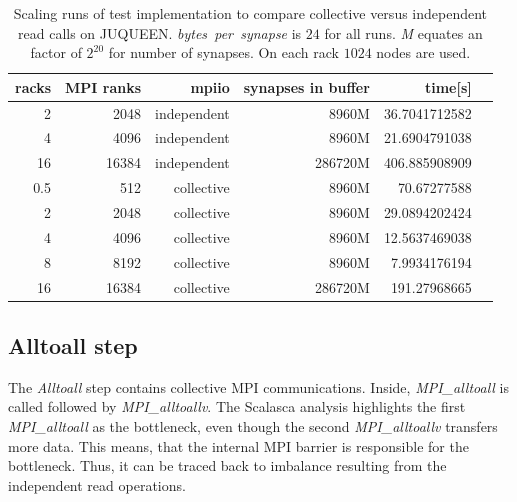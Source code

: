 \begin{table}[h!]
\begin{center}
\begin{tabular}{|r|r|r|r|r|r|}
\hline
racks & MPI ranks & mpiio & synapses in buffer & time[s] \\
\hline\hline
2  & 2048      & independent  &  8960M & 36.7041712582\\
4  & 4096      & independent  & 8960M  & 21.6904791038\\
16  & 16384      &  independent & 286720M  & 406.885908909\\
0.5  & 512      & collective  & 8960M  & 70.67277588\\
2  & 2048      & collective  & 8960M  & 29.0894202424\\
4  & 4096      & collective  & 8960M  & 12.5637469038\\
8  & 8192      & collective  &  8960M & 7.9934176194\\
16  & 16384      &  collective & 286720M  & 191.27968665\\
\hline
\end{tabular}
\end{center}
\caption{Scaling runs of test implementation to compare collective versus independent read calls on JUQUEEN. \emph{bytes~per~synapse} is $24$ for all runs.
  \emph{M} equates an factor of $2^{20}$ for number of synapses. On each rack $1024$ nodes are used.}
\label{schumann:tbl:indevscol}
\end{table}
\subsection{Alltoall step}
The \emph{Alltoall} step contains collective MPI communications.
Inside, \emph{MPI\_alltoall} is called followed by \emph{MPI\_alltoallv}.
The Scalasca analysis highlights the first \emph{MPI\_alltoall} as the bottleneck,
even though the second \emph{MPI\_alltoallv} transfers more data.
This means, that the internal MPI barrier is responsible for the bottleneck.
Thus, it can be traced back to imbalance resulting from the independent read operations.

